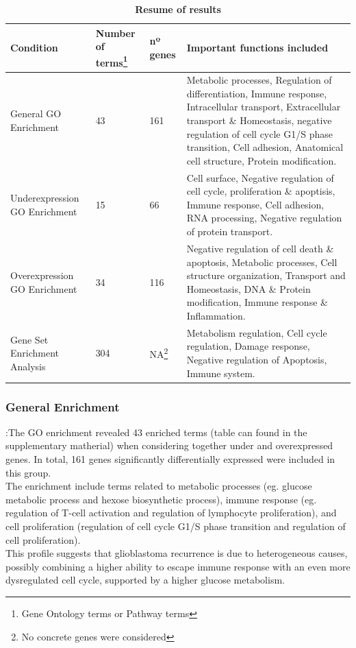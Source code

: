 \documentclass[9pt,twocolumn,twoside]{gsajnl}
\begin{document}
\begin{table}[!htbp]
\centering
\caption{\bf Resume of results}
\begin{tableminipage}{\textwidth}
\begin{tabularx}{\textwidth}{m{3.4cm}m{2.6cm}m{1.5cm}m{9.2cm}}
\hline
Condition & Number of terms\footnote{Gene Ontology terms or Pathway terms} & nº genes & Important functions included\\
\hline

General GO Enrichment & 43 & 161 & Metabolic processes, Regulation of differentiation, Immune response, Intracellular transport, Extracellular transport \& Homeostasis, negative regulation of cell cycle G1/S phase transition, Cell adhesion, Anatomical cell structure, Protein modification. \\

Underexpression GO Enrichment & 15 & 66 & Cell surface, Negative regulation of cell cycle, proliferation \& apoptisis, Immune response, Cell adhesion, RNA processing, Negative regulation of protein transport.\\

Overexpression GO Enrichment & 34 & 116 & Negative regulation of cell death \& apoptosis, Metabolic processes, Cell structure organization, Transport and Homeostasis, DNA \& Protein modification, Immune response \& Inflammation.\\

Gene Set Enrichment Analysis & 304 & NA\footnote{No concrete genes were considered} & Metabolism regulation, Cell cycle regulation, Damage response, Negative regulation of Apoptosis, Immune system. \\

\hline
\end{tabularx}
  \label{tab:resume}
\end{tableminipage}
\end{table}

\subsubsection*{General Enrichment}:The GO enrichment revealed 43 enriched terms (table can found in the supplementary matherial) when considering together under and overexpressed genes. In total, 161 genes significantly differentially expressed were included in this group.\\
The enrichment include terms related to metabolic processes (eg. glucose metabolic process and hexose biosynthetic process), immune response (eg. regulation of T-cell activation and regulation of lymphocyte proliferation), and cell proliferation (regulation of cell cycle G1/S phase transition and regulation of cell proliferation).\\
This profile suggests that glioblastoma recurrence is due to heterogeneous causes, possibly combining a higher ability to escape immune response with an even more dysregulated cell cycle, supported by a higher glucose metabolism.
\end{document}
